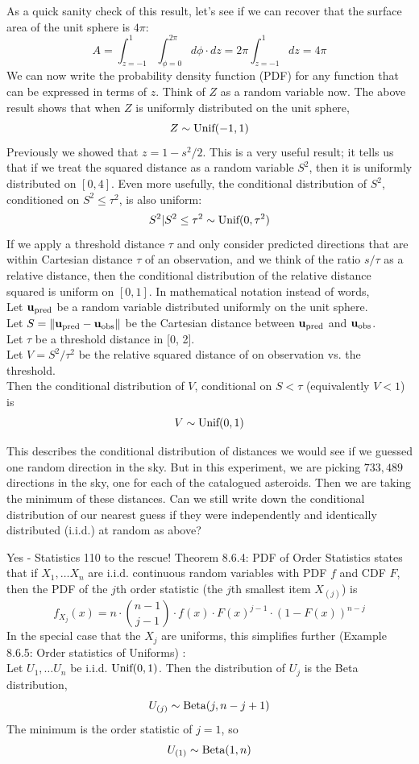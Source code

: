 As a quick sanity check of this result, let's see if we can recover that the surface area of  the unit sphere is $4 \pi$:
$$ A = \int_{z = -1}^{1} \int_{\phi=0}^{2 \pi} d \phi \cdot dz = 2 \pi \int_{z = -1}^{1} dz = 4 \pi$$
We can now write the probability density function (PDF) for any function that can be expressed in terms of $z$.
Think of $Z$ as a random variable now.  The above result shows that when $Z$ is uniformly distributed on the unit sphere,
$$Z \sim \textnormal{Unif}(-1, 1)$$
Previously we showed that $z = 1 - s^2 / 2$.
This is a very useful result; it tells us that if we treat the squared distance as a random variable $S^2$, then it is uniformly distributed on $[0, 4]$.
Even more usefully, the conditional distribution of $S^2$, conditioned on $S^2 \le \tau^2$, is also uniform:
$$ S^2 | S^2 \le \tau^2 \sim \textnormal{Unif}(0, \tau^2)$$
If we apply a threshold distance $\tau$ and only consider predicted directions that are within Cartesian distance $\tau$ of an observation,
and we think of the ratio $s / \tau$ as a relative distance,
then the conditional distribution of the relative distance squared is uniform on $[0, 1]$.
In mathematical notation instead of words, \\ 
Let $\mathbf{u}_{\mathrm{pred}}$ be a random variable distributed uniformly on the unit sphere.\\
Let $S = \lVert\mathbf{u}_{\mathrm{pred}} - \mathbf{u}_{\mathrm{obs}}\rVert$ be the Cartesian distance between $\mathbf{u}_{\mathrm{pred}}$ and $\mathbf{u}_{\mathrm{obs}}$. \\
Let $\tau$ be a threshold distance in [0, 2].\\
Let $V = S^2 / \tau^2$ be the relative squared distance of on observation vs. the threshold.\\
Then the conditional distribution of $V$, conditional on $S < \tau$ (equivalently $V < 1$) is
$$V \sim \textnormal{Unif}(0, 1)$$

This describes the conditional distribution of distances we would see if we guessed one random direction in the sky.
But in this experiment, we are picking $733,489$ directions in the sky, one for each of the catalogued asteroids.
Then we are taking the minimum of these distances.
Can we still write down the conditional distribution of our nearest guess 
if they were independently and identically distributed (i.i.d.) at random as above?

Yes - Statistics 110 to the rescue!
Theorem 8.6.4: PDF of Order Statistics \cite{BH} states that if $X_1, \ldots X_n$ are i.i.d. continuous random variables
with PDF $f$ and CDF $F$, then the PDF of the $j$th order statistic (the $j$th smallest item $X_{(j)}$) is
$$f_{X_{j}}(x) = n \cdot {{n-1}\choose{j-1}} \cdot f(x) \cdot F(x)^{j-1} \cdot (1 - F(x))^{n-j}$$
In the special case that the $X_j$ are uniforms, this simplifies further (Example 8.6.5: Order statistics of Uniforms) \cite{BH}:\\
Let $U_1, \ldots U_n$ be i.i.d. $\textnormal{Unif}(0,1)$.
Then the distribution of $U_{j}$ is the Beta distribution,
$$U_{(j)} \sim \textnormal{Beta}(j, n-j+1)$$
The minimum is the order statistic of $j=1$, so
$$U_{(1)} \sim \textnormal{Beta}(1, n)$$ 

